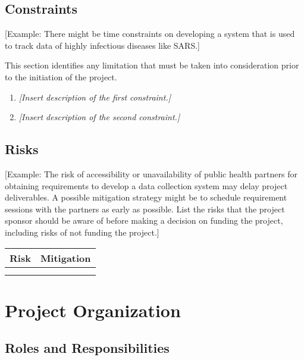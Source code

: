 \documentclass[a4paper, 11pt]{article}
\begin{document}
\hypertarget{constraints}{%
\subsection{Constraints}\label{constraints}}

{[}Example: There might be time constraints on developing a system that
is used to track data of highly infectious diseases like SARS.{]}

This section identifies any limitation that must be taken into
consideration prior to the initiation of the project.

\begin{enumerate}
\def\labelenumi{\arabic{enumi}.}
\item
  \emph{{[}Insert description of the first constraint.{]}}
\item
  \emph{{[}Insert description of the second constraint.{]}}
\end{enumerate}

\hypertarget{risks}{%
\subsection{Risks}\label{risks}}

{[}Example: The risk of accessibility or unavailability of public health
partners for obtaining requirements to develop a data collection system
may delay project deliverables. A possible mitigation strategy might be
to schedule requirement sessions with the partners as early as possible.
List the risks that the project sponsor should be aware of before making
a decision on funding the project, including risks of not funding the
project.{]}

\begin{longtable}[]{@{}ll@{}}
\toprule
\textbf{Risk} & \textbf{Mitigation}\tabularnewline
\midrule
\endhead
&\tabularnewline
&\tabularnewline
\bottomrule
\end{longtable}

\hypertarget{project-organization}{%
\section{Project Organization}\label{project-organization}}

\hypertarget{roles-and-responsibilities}{%
\subsection{Roles and
Responsibilities}\label{roles-and-responsibilities}}
\end{document}

